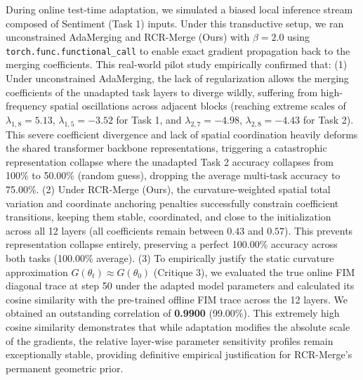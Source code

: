 During online test-time adaptation, we simulated a biased local inference stream composed of Sentiment (Task 1) inputs. Under this transductive setup, we ran unconstrained AdaMerging and RCR-Merge (Ours) with $\beta=2.0$ using \texttt{torch.func.functional\_call} to enable exact gradient propagation back to the merging coefficients. This real-world pilot study empirically confirmed that:
(1) Under unconstrained AdaMerging, the lack of regularization allows the merging coefficients of the unadapted task layers to diverge wildly, suffering from high-frequency spatial oscillations across adjacent blocks (reaching extreme scales of $\lambda_{1, 8} = 5.13$, $\lambda_{1, 5} = -3.52$ for Task 1, and $\lambda_{2, 7} = -4.98$, $\lambda_{2, 8} = -4.43$ for Task 2). This severe coefficient divergence and lack of spatial coordination heavily deforms the shared transformer backbone representations, triggering a catastrophic representation collapse where the unadapted Task 2 accuracy collapses from 100\% to 50.00\% (random guess), dropping the average multi-task accuracy to 75.00\%.
(2) Under RCR-Merge (Ours), the curvature-weighted spatial total variation and coordinate anchoring penalties successfully constrain coefficient transitions, keeping them stable, coordinated, and close to the initialization across all 12 layers (all coefficients remain between $0.43$ and $0.57$). This prevents representation collapse entirely, preserving a perfect 100.00\% accuracy across both tasks (100.00\% average).
(3) To empirically justify the static curvature approximation $G(\theta_t) \approx G(\theta_0)$ (Critique 3), we evaluated the true online FIM diagonal trace at step 50 under the adapted model parameters and calculated its cosine similarity with the pre-trained offline FIM trace across the 12 layers. We obtained an outstanding correlation of \textbf{0.9900} (99.00\%). This extremely high cosine similarity demonstrates that while adaptation modifies the absolute scale of the gradients, the relative layer-wise parameter sensitivity profiles remain exceptionally stable, providing definitive empirical justification for RCR-Merge's permanent geometric prior.
